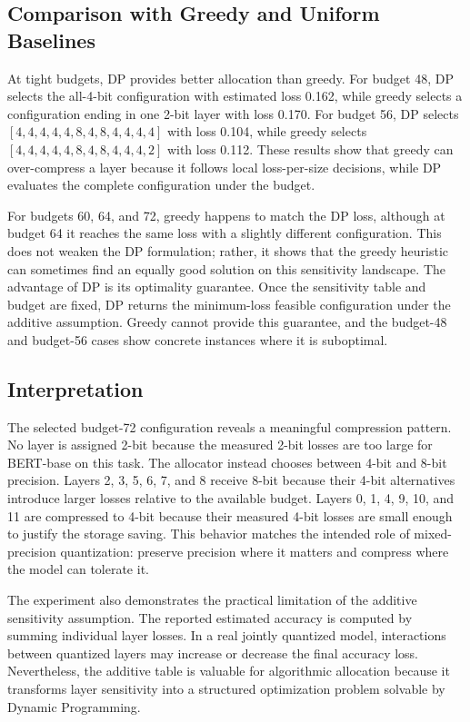 \documentclass[conference]{IEEEtran}
\begin{document}
\subsection{Comparison with Greedy and Uniform Baselines}
At tight budgets, DP provides better allocation than greedy. For budget 48, DP selects the all-4-bit configuration with estimated loss 0.162, while greedy selects a configuration ending in one 2-bit layer with loss 0.170. For budget 56, DP selects $[4,4,4,4,4,8,4,8,4,4,4,4]$ with loss 0.104, while greedy selects $[4,4,4,4,4,8,4,8,4,4,4,2]$ with loss 0.112. These results show that greedy can over-compress a layer because it follows local loss-per-size decisions, while DP evaluates the complete configuration under the budget.

For budgets 60, 64, and 72, greedy happens to match the DP loss, although at budget 64 it reaches the same loss with a slightly different configuration. This does not weaken the DP formulation; rather, it shows that the greedy heuristic can sometimes find an equally good solution on this sensitivity landscape. The advantage of DP is its optimality guarantee. Once the sensitivity table and budget are fixed, DP returns the minimum-loss feasible configuration under the additive assumption. Greedy cannot provide this guarantee, and the budget-48 and budget-56 cases show concrete instances where it is suboptimal.

\subsection{Interpretation}
The selected budget-72 configuration reveals a meaningful compression pattern. No layer is assigned 2-bit because the measured 2-bit losses are too large for BERT-base on this task. The allocator instead chooses between 4-bit and 8-bit precision. Layers 2, 3, 5, 6, 7, and 8 receive 8-bit because their 4-bit alternatives introduce larger losses relative to the available budget. Layers 0, 1, 4, 9, 10, and 11 are compressed to 4-bit because their measured 4-bit losses are small enough to justify the storage saving. This behavior matches the intended role of mixed-precision quantization: preserve precision where it matters and compress where the model can tolerate it.

The experiment also demonstrates the practical limitation of the additive sensitivity assumption. The reported estimated accuracy is computed by summing individual layer losses. In a real jointly quantized model, interactions between quantized layers may increase or decrease the final accuracy loss. Nevertheless, the additive table is valuable for algorithmic allocation because it transforms layer sensitivity into a structured optimization problem solvable by Dynamic Programming.
\end{document}
